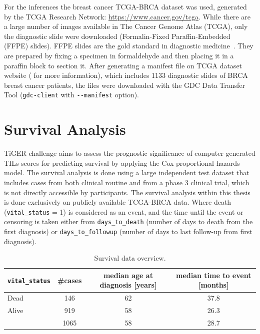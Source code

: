 For the inferences the breast cancer TCGA-BRCA dataset was used, generated by
the TCGA Research Network: \hyperlink{https://www.cancer.gov/tcga}{https://www.cancer.gov/tcga}.
While there are a large number of images available in The Cancer Genome Atlas (TCGA),
only the diagnostic slide were downloaded (Formalin-Fixed Paraffin-Embedded (FFPE) slides).
FFPE slides are the gold standard in diagnostic medicine~\cite{smith_2014}.
They are prepared by fixing a specimen in formaldehyde and then placing it in a
paraffin block to section it. 
After generating a manifest file on TCGA dataset website (\cite{choosehappy_2018} for more information), which includes 1133 diagnostic slides
of BRCA breast cancer patients, the files were downloaded with the GDC Data Transfer Tool
(\verb+gdc-client+ with \verb+--manifest+ option). 


\section{Survival Analysis}
TiGER challenge aims to assess the prognostic significance of computer-generated TILs scores
for predicting survival by applying the Cox proportional hazards model. The survival analysis
is done using a large independent test dataset that includes cases from both clinical routine and from a phase 3 clinical trial, which is not directly accessible by participants. The survival analysis
within this thesis is done exclusively on publicly available TCGA-BRCA data. Where death
(\texttt{vital\_status} = 1) is considered as an event, and the time until the event or censoring is
taken either from \texttt{days\_to\_death} (number of days to death from the first diagnosis) or \texttt{days\_to\_followup}
(number of days to last follow-up from first diagnosis). 
\begin{table}[h!]
\centering
\begin{tabular}{ l c c c } 
\hline
\texttt{vital\_status} & \#cases & median age at diagnosis [years] & median time to event [months]\\ 
\hline
Dead & 146 & 62 & 37.8\\ 
Alive & 919 & 58 & 26.3\\ 
\hline
 & 1065 & 58 & 28.7\\
\end{tabular}
\caption{\label{tab:surv_data}Survival data overview.}
\end{table}